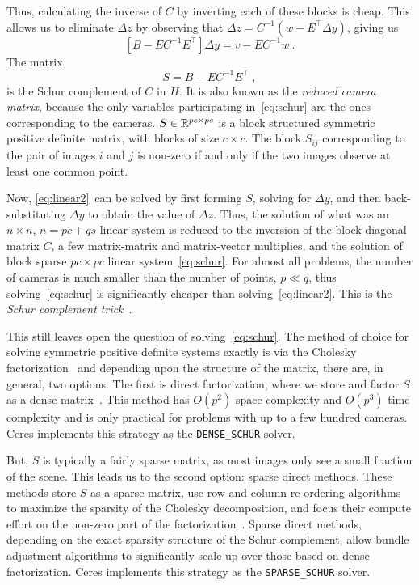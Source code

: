 Thus, calculating the inverse of $C$ by inverting each of these blocks is  cheap. This allows us to  eliminate $\Delta z$ by observing that $\Delta z = C^{-1}(w - E^\top \Delta y)$, giving us
\begin{equation}
        \left[B - EC^{-1}E^\top\right] \Delta y = v - EC^{-1}w\ .  \label{eq:schur}
\end{equation}
The matrix
\begin{equation}
S = B - EC^{-1}E^\top\ ,
\end{equation}
is the Schur complement of $C$ in $H$. It is also known as the {\em reduced camera matrix}, because the only variables participating in~\eqref{eq:schur} are the ones corresponding to the cameras. $S \in \mathbb{R}^{pc\times pc}$ is a block structured symmetric positive definite matrix, with blocks of size $c\times c$. The block $S_{ij}$ corresponding to the pair of images $i$ and $j$ is non-zero if and only if the two images observe at least one common point.

Now, \eqref{eq:linear2}~can  be solved by first forming $S$, solving for $\Delta y$, and then back-substituting $\Delta y$ to obtain the value of $\Delta z$.
Thus, the solution of what was an $n\times n$, $n=pc+qs$ linear system is reduced to the inversion of the block diagonal matrix $C$, a few matrix-matrix and matrix-vector multiplies, and the solution of block sparse $pc\times pc$ linear system~\eqref{eq:schur}.  For almost all  problems, the number of cameras is much smaller than the number of points, $p \ll q$, thus solving~\eqref{eq:schur} is significantly cheaper than solving~\eqref{eq:linear2}. This is the {\em Schur complement trick}~\cite{brown-58}.

This still leaves open the question of solving~\eqref{eq:schur}. The
method of choice for solving symmetric positive definite systems
exactly is via the Cholesky
factorization~\cite{trefethen1997numerical} and depending upon the
structure of the matrix, there are, in general, two options. The first
is direct factorization, where we store and factor $S$ as a dense
matrix~\cite{trefethen1997numerical}. This method has $O(p^2)$ space complexity and $O(p^3)$ time
complexity and is only practical for problems with up to a few hundred
cameras. Ceres implements this strategy as the \texttt{DENSE\_SCHUR} solver.


 But, $S$ is typically a fairly sparse matrix, as most images
only see a small fraction of the scene. This leads us to the second
option: sparse direct methods. These methods store $S$ as a sparse
matrix, use row and column re-ordering algorithms to maximize the
sparsity of the Cholesky decomposition, and focus their compute effort
on the non-zero part of the factorization~\cite{chen2006acs}.
Sparse direct methods, depending on the exact sparsity structure of the Schur complement,
allow bundle adjustment algorithms to significantly scale up over those based on dense
factorization. Ceres implements this strategy as the \texttt{SPARSE\_SCHUR} solver.


